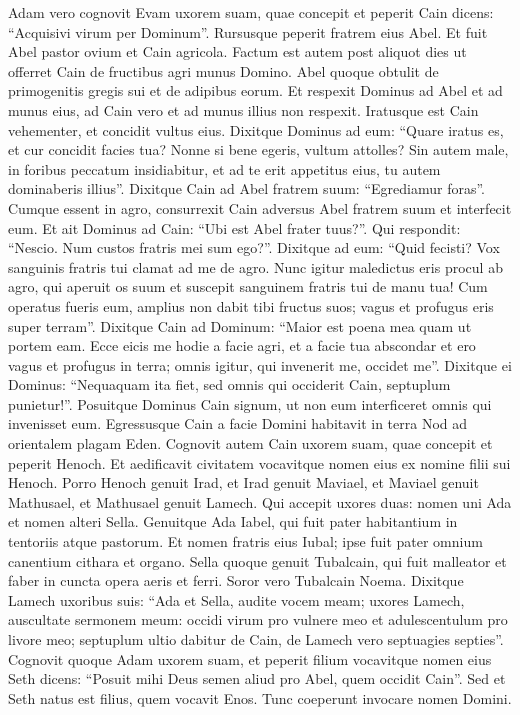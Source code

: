 \begin{biblechapter}  
\verse Adam vero cognovit Evam uxorem suam, quae concepit et peperit Cain dicens: “Acquisivi virum per Dominum”. 
\verse Rursusque peperit fratrem eius Abel. Et fuit Abel pastor ovium et Cain agricola. 
\verse Factum est autem post aliquot dies ut offerret Cain de fructibus agri munus Domino. 
\verse Abel quoque obtulit de primogenitis gregis sui et de adipibus eorum. Et respexit Dominus ad Abel et ad munus eius, 
\verse ad Cain vero et ad munus illius non respexit. Iratusque est Cain vehementer, et concidit vultus eius. 
\verse Dixitque Dominus ad eum: “Quare iratus es, et cur concidit facies tua? 
\verse Nonne si bene egeris, vultum attolles? Sin autem male, in foribus peccatum insidiabitur, et ad te erit appetitus eius, tu autem dominaberis illius”. 
\verse Dixitque Cain ad Abel fratrem suum: “Egrediamur foras”. Cumque essent in agro, consurrexit Cain adversus Abel fratrem suum et interfecit eum. 
\verse Et ait Dominus ad Cain: “Ubi est Abel frater tuus?”. Qui respondit: “Nescio. Num custos fratris mei sum ego?”. 
\verse Dixitque ad eum: “Quid fecisti? Vox sanguinis fratris tui clamat ad me de agro. 
\verse Nunc igitur maledictus eris procul ab agro, qui aperuit os suum et suscepit sanguinem fratris tui de manu tua! 
\verse Cum operatus fueris eum, amplius non dabit tibi fructus suos; vagus et profugus eris super terram”. 
\verse Dixitque Cain ad Dominum: “Maior est poena mea quam ut portem eam. 
\verse Ecce eicis me hodie a facie agri, et a facie tua abscondar et ero vagus et profugus in terra; omnis igitur, qui invenerit me, occidet me”. 
\verse Dixitque ei Dominus: “Nequaquam ita fiet, sed omnis qui occiderit Cain, septuplum punietur!”. Posuitque Dominus Cain signum, ut non eum interficeret omnis qui invenisset eum. 
\verse Egressusque Cain a facie Domini habitavit in terra Nod ad orientalem plagam Eden. 
\verse Cognovit autem Cain uxorem suam, quae concepit et peperit Henoch. Et aedificavit civitatem vocavitque nomen eius ex nomine filii sui Henoch. 
\verse Porro Henoch genuit Irad, et Irad genuit Maviael, et Maviael genuit Mathusael, et Mathusael genuit Lamech. 
\verse Qui accepit uxores duas: nomen uni Ada et nomen alteri Sella. 
\verse Genuitque Ada Iabel, qui fuit pater habitantium in tentoriis atque pastorum. 
\verse Et nomen fratris eius Iubal; ipse fuit pater omnium canentium cithara et organo. 
\verse Sella quoque genuit Tubalcain, qui fuit malleator et faber in cuncta opera aeris et ferri. Soror vero Tubalcain Noema. 
\verse Dixitque Lamech uxoribus suis: “Ada et Sella, audite vocem meam; uxores Lamech, auscultate sermonem meum: occidi virum pro vulnere meo et adulescentulum pro livore meo; 
\verse septuplum ultio dabitur de Cain, de Lamech vero septuagies septies”. 
\verse Cognovit quoque Adam uxorem suam, et peperit filium vocavitque nomen eius Seth dicens: “Posuit mihi Deus semen aliud pro Abel, quem occidit Cain”. 
\verse Sed et Seth natus est filius, quem vocavit Enos. Tunc coeperunt invocare nomen Domini. 
\end{biblechapter}


